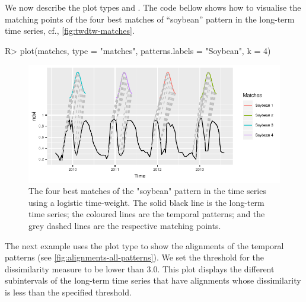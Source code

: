 \documentclass[article,shortnames]{jss}
\begin{document}
We now describe the plot types  and . The
code bellow shows how to visualise the matching points of the four best
matches of ``soybean'' pattern in the long-term time series, cf.,
\autoref{fig:twdtw-matches}.

\begin{CodeChunk}

\begin{CodeInput}
R> plot(matches, type = "matches", patterns.labels = "Soybean", k = 4)
\end{CodeInput}
\begin{figure}[!h]

{\centering \includegraphics{dtwSat_files/figure-latex/twdtw-matches-1} 

}

\caption[The four best matches of the "soybean" pattern in the time series using a logistic time-weight]{The four best matches of the "soybean" pattern in the time series using a logistic time-weight. The solid black line is the long-term time series; the coloured lines are the temporal patterns; and the grey dashed lines are the respective matching points.}\label{fig:twdtw-matches}
\end{figure}
\end{CodeChunk}

The next example uses the plot type  to show the
alignments of the temporal patterns (see
\autoref{fig:alignments-all-patterns}). We set the threshold for the
dissimilarity measure to be lower than \(3.0\). This plot displays the
different subintervals of the long-term time series that have alignments
whose dissimilarity is less than the specified threshold.
\end{document}
